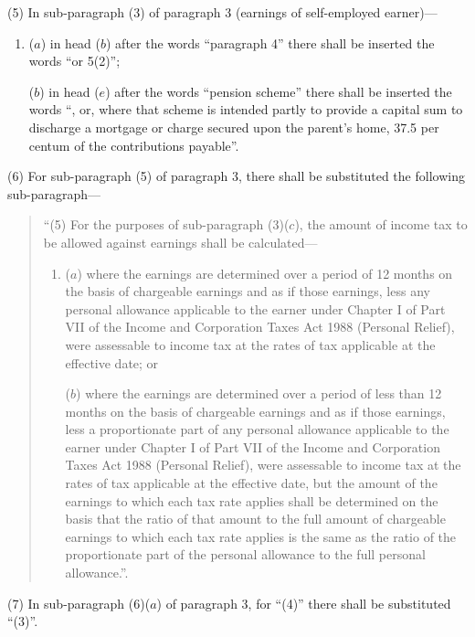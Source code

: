 \documentclass[12pt,a4paper]{article}
\begin{document}
(5) In sub-paragraph (3) of paragraph 3 (earnings of self-employed earner)—
\begin{enumerate}\item[]
($a$) in head ($b$) after the words “paragraph 4” there shall be inserted the words “or 5(2)”;

($b$) in head ($e$) after the words “pension scheme” there shall be inserted the words “, or, where that scheme is intended partly to provide a capital sum to discharge a mortgage or charge secured upon the parent’s home, 37.5 per centum of the contributions payable”.
\end{enumerate}

(6) For sub-paragraph (5) of paragraph 3, there shall be substituted the following sub-paragraph—
\begin{quotation}
“(5) For the purposes of sub-paragraph (3)($c$), the amount of income tax to be allowed against earnings shall be calculated—
\begin{enumerate}\item[]
($a$) where the earnings are determined over a period of 12 months on the basis of chargeable earnings and as if those earnings, less any personal allowance applicable to the earner under Chapter I of Part VII of the Income and Corporation Taxes Act 1988 (Personal Relief), were assessable to income tax at the rates of tax applicable at the effective date; or

($b$) where the earnings are determined over a period of less than 12 months on the basis of chargeable earnings and as if those earnings, less a proportionate part of any personal allowance applicable to the earner under Chapter I of Part VII of the Income and Corporation Taxes Act 1988 (Personal Relief), were assessable to income tax at the rates of tax applicable at the effective date, but the amount of the earnings to which each tax rate applies shall be determined on the basis that the ratio of that amount to the full amount of chargeable earnings to which each tax rate applies is the same as the ratio of the proportionate part of the personal allowance to the full personal allowance.”.
\end{enumerate}
\end{quotation}

(7) In sub-paragraph (6)($a$) of paragraph 3, for “(4)” there shall be substituted “(3)”.
\end{document}
